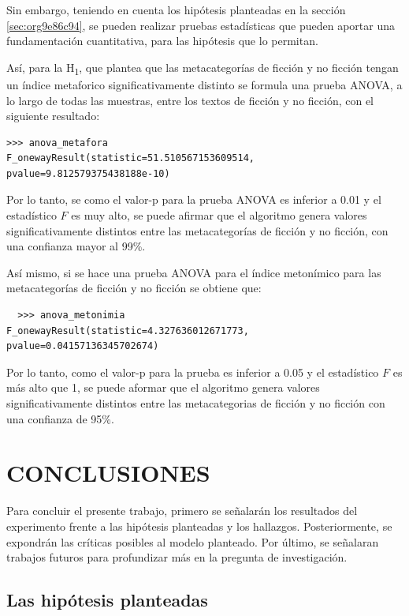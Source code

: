 \documentclass[12pt,letterpaper,twoside]{article}
\begin{document}
Sin embargo, teniendo en cuenta los hipótesis planteadas en la sección \ref{sec:org9e86c94},
se pueden realizar pruebas estadísticas que pueden aportar una fundamentación cuantitativa,
para las hipótesis que lo permitan.

Así, para la H\textsubscript{1}, que plantea que las metacategorías de ficción y no ficción tengan un
índice metaforico significativamente distinto se formula una prueba ANOVA, a lo largo de
todas las muestras, entre los textos de ficción y no ficción, con el siguiente resultado:

\begin{verbatim}
>>> anova_metafora
F_onewayResult(statistic=51.510567153609514, pvalue=9.812579375438188e-10)

\end{verbatim}

Por lo tanto, se como el valor-p para la prueba ANOVA es inferior a 0.01 y
el estadístico \(F\) es muy alto, se puede afirmar que el algoritmo genera valores
significativamente distintos entre las metacategorías de ficción y no ficción,
con una confianza mayor al 99\%.

Así mismo, si se hace una prueba ANOVA para el índice metonímico para las
metacategorías de ficción y no ficción se obtiene que:


\begin{verbatim}
  >>> anova_metonimia
F_onewayResult(statistic=4.327636012671773, pvalue=0.04157136345702674)

\end{verbatim}

Por lo tanto, como el valor-p para la prueba es inferior a 0.05 y el estadístico
\(F\) es más alto que 1, se puede aformar que el algoritmo genera valores
significativamente distintos entre las metacategorias de ficción y no ficción
con una confianza de 95\%.


\section{CONCLUSIONES}
\label{sec:org2c02b72}

Para concluir el presente trabajo, primero se señalarán los resultados
del experimento frente a las hipótesis planteadas y los hallazgos.
Posteriormente, se expondrán las críticas posibles al modelo
planteado. Por último, se señalaran trabajos futuros para profundizar
más en la pregunta de investigación.

\subsection{Las hipótesis planteadas}
\label{sec:orgc4bf250}
\end{document}
